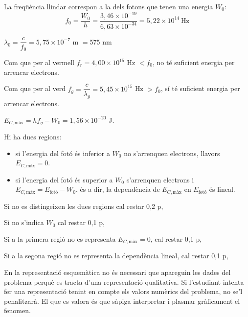 \begin{solapartat}
 La freqüència llindar correspon a la dels fotons que tenen una energia
$W_0$:
\[ f_0 = \frac{W_0}{h} = \frac{3,46\times 10^{-19}}{6,63\times 10^{-34}} = 5,22\times 10^{14}\ \mathrm{Hz} \]

 $\lambda_0 = \dfrac{c}{f_0} = 5,75\times 10^{-7}$ m $= 575$ nm

 Com que per al vermell $f_r = 4,00\times 10^{15}$ Hz $< f_0$, no té suficient
energia per arrencar electrons.

 Com que per al verd $f_g = \dfrac{c}{\lambda_g} = 5,45\times 10^{15}$ Hz
$> f_0$, sí té suficient energia per arrencar electrons.

 $E_{C,\text{màx}} = hf_g - W_0 = 1,56\times 10^{-20}$ J.


Hi ha dues regions:
\begin{itemize}
\item si l'energia del fotó és inferior a $W_0$ no s'arrenquen electrons, llavors $E_{C,\text{màx}} = 0$.
\item si l'energia del fotó és superior a $W_0$ s'arrenquen electrons i $E_{C,\text{màx}} = E_{\text{fotó}} - W_0$, és a dir, la dependència de $E_{C,\text{màx}}$ en $E_{\text{fotó}}$ és lineal.
\end{itemize}

Si no es distingeixen les dues regions cal restar 0,2 p,

Si no s'indica $W_0$ cal restar 0,1 p,

Si a la primera regió no es representa $E_{C,\text{màx}} = 0$, cal restar 0,1 p,

Si a la segona regió no es representa la dependència lineal, cal restar 0,1 p,

En la representació esquemàtica no és necessari que apareguin les dades del problema
perquè es tracta d'una representació qualitativa. Si l'estudiant intenta fer una
representació tenint en compte els valors numèrics del problema, no se'l penalitzarà. El
que es valora és que sàpiga interpretar i plasmar gràficament el fenomen.
\end{solapartat}
